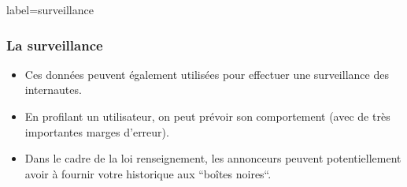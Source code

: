 \documentclass{beamer}
\begin{document}
        \begin{frame}{label=surveillance}
            \frametitle{La surveillance}
            \begin{center}
                \begin{itemize}
                    \item Ces données peuvent également utilisées pour effectuer une surveillance des internautes.
                    \pause
                    \item En profilant un utilisateur, on peut prévoir son comportement (avec de très importantes marges d'erreur).
                    \pause
                    \item Dans le cadre de la loi renseignement, les annonceurs peuvent potentiellement avoir à fournir votre historique aux ``boîtes noires``.
                \end{itemize}
            \end{center}
        \end{frame}
\end{document}
